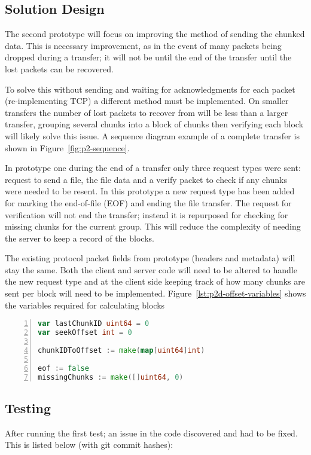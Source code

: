 \subsection*{Solution Design}
The second prototype will focus on improving the method of sending the chunked data. This is necessary improvement, as in the event of many packets being dropped during a transfer; it will not be until the end of the transfer until the lost packets can be recovered.

To solve this without sending and waiting for acknowledgments for each packet (re-implementing TCP) a different method must be implemented. On smaller transfers the number of lost packets to recover from will be less than a larger transfer, grouping several chunks into a block of chunks then verifying each block will likely solve this issue. A sequence diagram example of a complete transfer is shown in Figure~\ref{fig:p2-sequence}.

In prototype one during the end of a transfer only three request types were sent: request to send a file, the file data and a verify packet to check if any chunks were needed to be resent. In this prototype a new request type has been added for marking the end-of-file (EOF) and ending the file transfer. The request for verification will not end the transfer; instead it is repurposed for checking for missing chunks for the current group. This will reduce the complexity of needing the server to keep a record of the blocks.

The existing protocol packet fields from prototype (headers and metadata) will stay the same. Both the client and server code will need to be altered to handle the new request type and at the client side keeping track of how many chunks are sent per block will need to be implemented. Figure~\ref{lst:p2d-offset-variables} shows the variables required for calculating blocks

\begin{lstlisting}[caption={Prototype Two Offset Variables},label=lst:p2d-offset-variables,breaklines,numbers=left,language=go]
var lastChunkID uint64 = 0
var seekOffset int = 0

chunkIDToOffset := make(map[uint64]int)

eof := false
missingChunks := make([]uint64, 0)
\end{lstlisting}


\subsection*{Testing}
After running the first test; an issue in the code discovered and had to be fixed. This is listed below (with git commit hashes):

